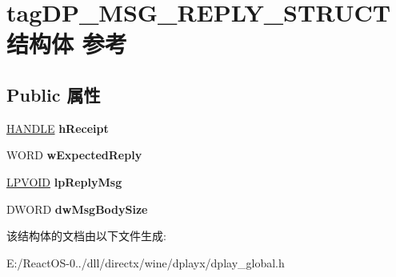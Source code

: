\hypertarget{structtag_d_p___m_s_g___r_e_p_l_y___s_t_r_u_c_t}{}\section{tag\+D\+P\+\_\+\+M\+S\+G\+\_\+\+R\+E\+P\+L\+Y\+\_\+\+S\+T\+R\+U\+C\+T结构体 参考}
\label{structtag_d_p___m_s_g___r_e_p_l_y___s_t_r_u_c_t}
\subsection*{Public 属性}
\begin{DoxyCompactItemize}
\item 
\mbox{\label{structtag_d_p___m_s_g___r_e_p_l_y___s_t_r_u_c_t_a0715ee1028c2818a3174f30e4683b24f}} 
\hyperlink{interfacevoid}{H\+A\+N\+D\+LE} {\bfseries h\+Receipt}
\item 
\mbox{\label{structtag_d_p___m_s_g___r_e_p_l_y___s_t_r_u_c_t_a3da4f676af35d801d9647cbcf1815ec2}} 
W\+O\+RD {\bfseries w\+Expected\+Reply}
\item 
\mbox{\label{structtag_d_p___m_s_g___r_e_p_l_y___s_t_r_u_c_t_abb05d40bba81dc2ce13e60e81d168d92}} 
\hyperlink{interfacevoid}{L\+P\+V\+O\+ID} {\bfseries lp\+Reply\+Msg}
\item 
\mbox{\label{structtag_d_p___m_s_g___r_e_p_l_y___s_t_r_u_c_t_aec3f2ff589b07ad1a04ffb7542e917f5}} 
D\+W\+O\+RD {\bfseries dw\+Msg\+Body\+Size}
\end{DoxyCompactItemize}


该结构体的文档由以下文件生成\+:\begin{DoxyCompactItemize}
\item 
E\+:/\+React\+O\+S-\/0../dll/directx/wine/dplayx/dplay\+\_\+global.\+h\end{DoxyCompactItemize}
